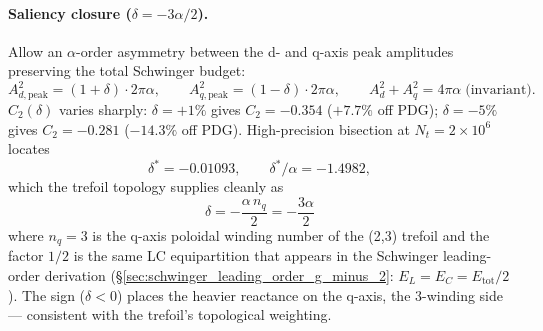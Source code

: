 \paragraph{Saliency closure ($\delta = -3\alpha/2$).} Allow an
$\alpha$-order asymmetry between the d- and q-axis peak amplitudes
preserving the total Schwinger budget:
\begin{equation}
    A_{d,\text{peak}}^2 = (1+\delta)\cdot 2\pi\alpha,\qquad
    A_{q,\text{peak}}^2 = (1-\delta)\cdot 2\pi\alpha,\qquad
    A_d^2+A_q^2 = 4\pi\alpha\;\text{(invariant)}.
\end{equation}
$C_2(\delta)$ varies sharply: $\delta = +1\%$ gives $C_2 = -0.354$
($+7.7\%$ off PDG); $\delta = -5\%$ gives $C_2 = -0.281$ ($-14.3\%$
off PDG). High-precision bisection at $N_t = 2\times 10^6$ locates
\begin{equation}
    \delta^* = -0.01093,\qquad
    \delta^*/\alpha = -1.4982,
\end{equation}
which the trefoil topology supplies cleanly as
\begin{equation}
    \boxed{\;\delta = -\frac{\alpha\, n_q}{2} = -\frac{3\alpha}{2}\;}
\end{equation}
where $n_q = 3$ is the q-axis poloidal winding number of the (2,3)
trefoil and the factor $1/2$ is the same LC equipartition that
appears in the Schwinger leading-order derivation
(\S\ref{sec:schwinger_leading_order_g_minus_2}: $E_L = E_C = E_{\text{tot}}/2$).
The sign ($\delta < 0$) places the heavier reactance on the q-axis,
the 3-winding side --- consistent with the trefoil's topological
weighting.


